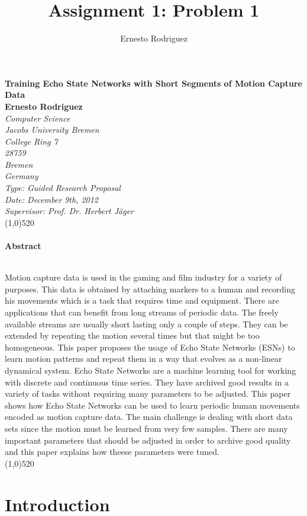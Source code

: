 \documentclass[letterpaper,9pt]{article}
\title{Assignment 1: Problem 1}
\author{Ernesto Rodriguez}
\begin{document}
\Huge{\bf Training Echo State Networks with Short Segments of Motion Capture Data\\[1cm]}
\large{\bf Ernesto Rodriguez\\[0.5cm]}
\emph{Computer Science \\ Jacobs University Bremen \\ College Ring 7 \\ 28759 \\ Bremen \\ Germany\\[0.5cm]}
\emph{Type: Guided Research Proposal \\ Date: December 9th, 2012 \\ Supervisor: Prof. Dr. Herbert J\"{a}ger\\}
\line(1,0){520}\\ \\
\Large{\bf Abstract\\ \\}

Motion capture data is used in the gaming and film industry for a variety of purposes. This data is obtained by attaching markers to a human and recording his movements which is a task that requires time and equipment. There are applications that can benefit from long streams of periodic data. The freely available streams are usually short lasting only a couple of steps. They can be extended by repeating the motion several times but that might be too homogeneous. This paper proposes the usage of Echo State Networks (ESNs) to learn motion patterns and repeat them in a way that evolves as a non-linear dynamical system. Echo State Networks are a machine learning tool for working with discrete and continuous time series. They have archived good results in a variety of tasks without requiring many parameters to be adjusted. This paper shows how Echo State Networks can be used to learn periodic human movements encoded as motion capture data. The main challenge is dealing with short data sets since the motion must be learned from very few samples. There are many important parameters that should be adjusted in order to archive good quality and this paper explains how theese parameters were tuned. \\

\noindent\line(1,0){520}

\pagebreak

\tableofcontents

\pagebreak

\section{Introduction}
\end{document}
